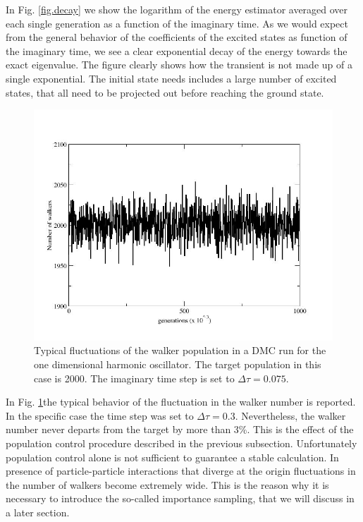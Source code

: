 In Fig. \ref{fig.decay} we show the logarithm of the energy estimator averaged over each single generation as a function of the imaginary time. As we would expect from the general behavior of the coefficients of the excited states as function of the imaginary time, we see a clear exponential decay of the energy towards the exact eigenvalue. The figure clearly shows how the transient is not made up of a single exponential. The initial state needs includes a large number of excited states, that all need to be projected out before reaching the ground state.
\begin{figure}
	\begin{center}
		\includegraphics[scale=0.5]{Chapter9-figures/walkers_dmc.jpg}
	\end{center}
	\caption{Typical fluctuations of the walker population in a DMC run for the one dimensional harmonic oscillator. The target population in this case is 2000. The imaginary time step is
		set to $\Delta\tau=0.075$. }
	\label{fig.walkers}
\end{figure}
In Fig. \ref{fig.walkers}the typical behavior of the fluctuation in the walker number is reported. In the specific case the time step was set to $\Delta\tau=0.3$. Nevertheless, the walker number never departs from the target by more than 3\%. This is the effect of the population control procedure described in the previous subsection. Unfortunately population control alone is not sufficient to guarantee a stable calculation. In presence of particle-particle interactions that diverge at the origin fluctuations in the number of walkers become extremely wide. This is the reason why it is necessary to introduce the so-called importance sampling, that we will discuss in a later section.
